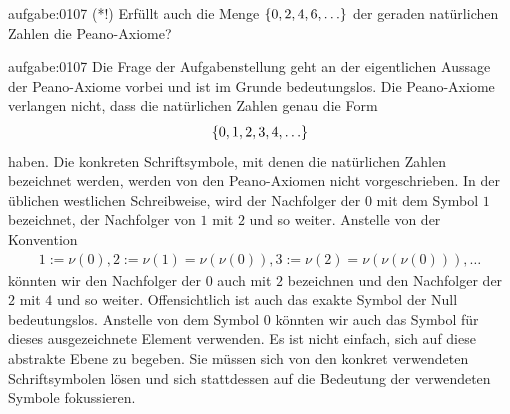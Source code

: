 \begin{aufgabe}{aufgabe:0107}
(*!) Erfüllt auch die Menge $\left\{0,2,4,6,\ldots\right\}$  der geraden natürlichen Zahlen die Peano-Axiome?
\end{aufgabe}
\begin{antwort}{aufgabe:0107}
Die Frage der Aufgabenstellung geht an der eigentlichen Aussage der Peano-Axiome vorbei und ist im Grunde bedeutungslos. Die Peano-Axiome verlangen nicht, dass die natürlichen Zahlen genau die Form
\begin{align*}
    \left\{0,1,2,3,4,\ldots\right\}
\end{align*}
haben. Die konkreten Schriftsymbole, mit denen die natürlichen Zahlen bezeichnet werden, werden von den Peano-Axiomen nicht vorgeschrieben. In der üblichen westlichen Schreibweise, wird der Nachfolger der $0$ mit dem Symbol $1$ bezeichnet, der Nachfolger von $1$ mit $2$ und so weiter. Anstelle von der Konvention
\begin{align*}
    1:=\nu(0), 2:=\nu(1)=\nu(\nu(0)), 3:=\nu(2)=\nu(\nu(\nu(0))), \ldots
\end{align*}
könnten wir den Nachfolger der $0$ auch mit $2$ bezeichnen und den Nachfolger der $2$ mit $4$ und so weiter. Offensichtlich ist auch das exakte Symbol der Null bedeutungslos. Anstelle von dem Symbol $0$ könnten wir auch das Symbol  für dieses ausgezeichnete Element verwenden. Es ist nicht einfach, sich auf diese abstrakte Ebene zu begeben. Sie müssen sich von den konkret verwendeten Schriftsymbolen lösen und sich stattdessen auf die Bedeutung der verwendeten Symbole fokussieren.
\end{antwort}

